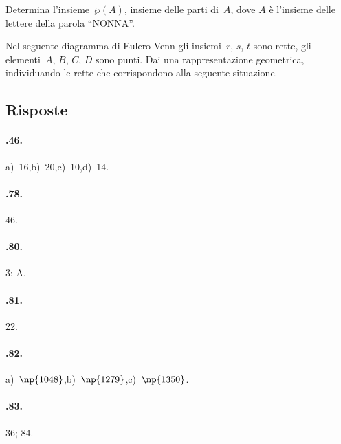 \begin{esercizio}
\label{ese:\thechapter.137}
Determina l'insieme~$\wp(A)$, insieme delle parti di~$A$, dove $A$ è l'insieme delle lettere della parola ``NONNA''.
\end{esercizio}

\begin{esercizio}
\label{ese:\thechapter.138}
Nel seguente diagramma di Eulero-Venn gli insiemi~$r$, $s$, $t$
sono rette, gli elementi~$A$, $B$, $C$, $D$ sono punti. Dai una
rappresentazione geometrica, individuando le rette che corrispondono
alla seguente situazione.

\begin{center}
 
\end{center}
\end{esercizio}

\subsection{Risposte}
\begin{multicols}{2}
\paragraph{\thechapter.46.} a)~16,\quad b)~20,\quad c)~10,\quad d)~14.

\paragraph{\thechapter.78.} 46.

\paragraph{\thechapter.80.} 3; A.

\paragraph{\thechapter.81.} 22.

\paragraph{\thechapter.82.} a)~$\np{1048}$,\quad b)~$\np{1279}$,\quad c)~$\np{1350}$.

\paragraph{\thechapter.83.} 36; 84.
\end{multicols}

